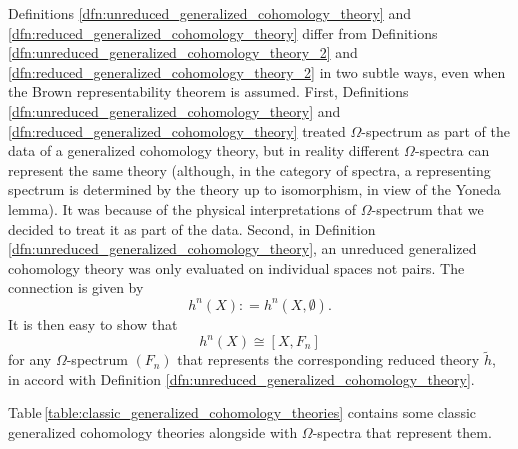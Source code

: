 \documentclass[sort&compress]{elsarticle}
\theoremstyle{theoremstyle}
\theoremstyle{framedtheoremstyle}
\theoremstyle{definitionstyle}
\theoremstyle{definitionstyle}
\theoremstyle{definitionstyle}
\theoremstyle{definitionstyle}
\newtheorem{exm}[nul]{Example}
\theoremstyle{nameddefinitionstyle}
\theoremstyle{framednameddefinitionstyle}
\theoremstyle{proofstyle}
\theoremstyle{definitionstyle}
\newcommand{\coloneq}{\mathrel{\mathop:}=}
\newcommand{\isomorphic}{\cong}
\newcommand{\paren}[1]{\left( #1 \right)}
\newcommand{\brackets}[1]{\left[ #1 \right]}
\begin{document}
\begin{appendices}
Definitions \ref{dfn:unreduced_generalized_cohomology_theory} and \ref{dfn:reduced_generalized_cohomology_theory} differ from Definitions \ref{dfn:unreduced_generalized_cohomology_theory_2} and \ref{dfn:reduced_generalized_cohomology_theory_2} in two subtle ways, even when the Brown representability theorem is assumed. First, Definitions \ref{dfn:unreduced_generalized_cohomology_theory} and \ref{dfn:reduced_generalized_cohomology_theory} treated $\Omega$-spectrum as part of the data of a generalized cohomology theory, but in reality different $\Omega$-spectra can represent the same theory (although, in the category of spectra, a representing spectrum is determined by the theory up to isomorphism, in view of the Yoneda lemma). It was because of the physical interpretations of $\Omega$-spectrum that we decided to treat it as part of the data. Second, in Definition \ref{dfn:unreduced_generalized_cohomology_theory}, an unreduced generalized cohomology theory was only evaluated on individual spaces not pairs. The connection is given by
\begin{equation}
h^n (X) \coloneq h^n (X, \emptyset).
\end{equation}
It is then easy to show that
\begin{equation}
h^n (X) \isomorphic \brackets{X, F_n }
\end{equation}
for any $\Omega$-spectrum $\paren{F_n}$ that represents the corresponding reduced theory $\tilde h$, in accord with Definition \ref{dfn:unreduced_generalized_cohomology_theory}.

%

Table\,\ref{table:classic_generalized_cohomology_theories} contains some classic generalized cohomology theories alongside with $\Omega$-spectra that represent them.


\end{appendices}
\end{document}
